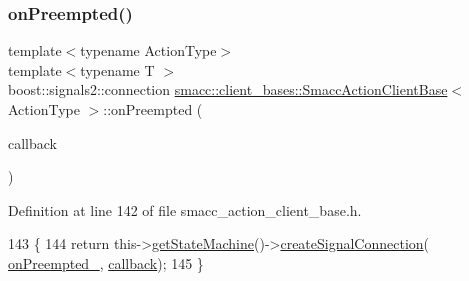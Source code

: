 \subsubsection{\texorpdfstring{on\+Preempted()}{onPreempted()}\hspace{0.1cm}{\footnotesize\ttfamily [2/2]}}
{\footnotesize\ttfamily template$<$typename Action\+Type$>$ \\
template$<$typename T $>$ \\
boost\+::signals2\+::connection \hyperlink{classsmacc_1_1client__bases_1_1SmaccActionClientBase}{smacc\+::client\+\_\+bases\+::\+Smacc\+Action\+Client\+Base}$<$ Action\+Type $>$\+::on\+Preempted (\begin{DoxyParamCaption}\item[{std\+::function$<$ void(Result\+Const\+Ptr \&)$>$}]{callback }\end{DoxyParamCaption})\hspace{0.3cm}{\ttfamily [inline]}}



Definition at line 142 of file smacc\+\_\+action\+\_\+client\+\_\+base.\+h.


\begin{DoxyCode}
143     \{
144         \textcolor{keywordflow}{return} this->\hyperlink{classsmacc_1_1ISmaccClient_aec51d4712404cb9882b86e4c854bb93a}{getStateMachine}()->\hyperlink{classsmacc_1_1ISmaccStateMachine_adf0f42ade0c65cc471960fe2a7c42da2}{createSignalConnection}(
      \hyperlink{classsmacc_1_1client__bases_1_1SmaccActionClientBase_a23846f928b48b5da809690883044b14b}{onPreempted\_}, \hyperlink{servers_2opencv__perception__node_2opencv__perception__node_8cpp_a050e697bd654facce10ea3f6549669b3}{callback});
145     \}
\end{DoxyCode}
\mbox{\label{classsmacc_1_1client__bases_1_1SmaccActionClientBase_a4a0f2dc95e6fbc7f25821f57e23b7905}} 
